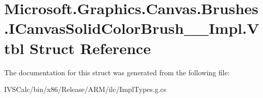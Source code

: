\hypertarget{struct_microsoft_1_1_graphics_1_1_canvas_1_1_brushes_1_1_i_canvas_solid_color_brush_____impl_1_1_vtbl}{}\section{Microsoft.\+Graphics.\+Canvas.\+Brushes.\+I\+Canvas\+Solid\+Color\+Brush\+\_\+\+\_\+\+Impl.\+Vtbl Struct Reference}
\label{struct_microsoft_1_1_graphics_1_1_canvas_1_1_brushes_1_1_i_canvas_solid_color_brush_____impl_1_1_vtbl}


The documentation for this struct was generated from the following file\+:\begin{DoxyCompactItemize}
\item 
I\+V\+S\+Calc/bin/x86/\+Release/\+A\+R\+M/ilc/Impl\+Types.\+g.\+cs\end{DoxyCompactItemize}
